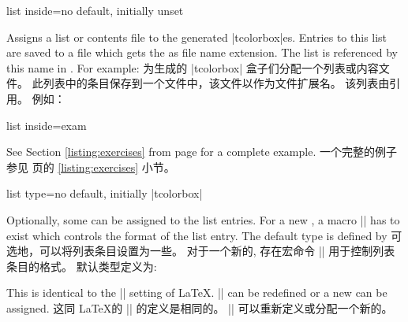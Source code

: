 \begin{newTcbKey}{list inside}{=}{no default, initially unset}
\begin{stripedbox}
Assigns a list or contents file to the generated |tcolorbox|es.
Entries to this list are saved to a file which gets the  as
file name extension. The list is referenced by this name in
.
For example:
\tcblower
为生成的 |tcolorbox| 盒子们分配一个列表或内容文件。%
此列表中的条目保存到一个文件中，该文件以作为文件扩展名。%
该列表由引用。%
例如：
\end{stripedbox}

\begin{dispListing}
list inside=exam
\end{dispListing}
\begin{stripedbox}
See Section \ref{listing:exercises} from page \pageref{listing:exercises}
for a complete example.
\tcblower
一个完整的例子参见 \pageref{listing:exercises} 页的 \ref{listing:exercises} 小节。
\end{stripedbox}
\end{newTcbKey}

\begin{newTcbKey}{list type}{=}{no default, initially |tcolorbox|}
\begin{stripedbox}
Optionally, some  can be assigned to the list entries.
For a new , a macro |\l@| has to exist which controls
the format of the list entry. The default type is defined by
\tcblower
可选地，可以将列表条目设置为一些。%
对于一个新的, 存在宏命令 |\l@| 用于控制列表条目的格式。%
默认类型定义为:
\end{stripedbox}

\begin{dispListing}
\newcommand*\l@tcolorbox{\@dottedtocline{1}{1.5em}{2.3em}}
\end{dispListing}
\begin{stripedbox}
This is identical to the |\l@section| setting of \LaTeX. |\l@tcolorbox| can
be redefined or a new  can be assigned.
\tcblower
这同 \LaTeX 的 |\l@section| 的定义是相同的。
|\l@tcolorbox| 可以重新定义或分配一个新的。
\end{stripedbox}
\end{newTcbKey}



